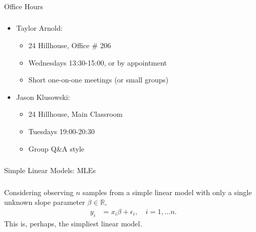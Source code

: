 \begin{frame}[fragile] \frametitle{}

\begin{flushright}
{\color{yaleblue}\sc\fontsize{1cm}{0cm}\selectfont Office Hours}
\end{flushright}

\end{frame}


\begin{frame}[fragile] \frametitle{}

\begin{itemize}
\item Taylor Arnold:
\begin{itemize}
\item 24 Hillhouse, Office \# 206
\item Wednesdays 13:30-15:00, or by appointment
\item Short one-on-one meetings (or small groups)
\end{itemize}
\item Jason Klusowski:
\begin{itemize}
\item 24 Hillhouse, Main Classroom
\item Tuesdays 19:00-20:30
\item Group Q\&A style
\end{itemize}
\end{itemize}

\end{frame}


\begin{frame}[fragile] \frametitle{}

\begin{flushright}
{\color{yaleblue}\sc\fontsize{1cm}{0cm}\selectfont Simple Linear Models: MLEs}
\end{flushright}

\end{frame}

\begin{frame}[fragile] \frametitle{}

Considering observing $n$ samples
from a simple linear model with only a single unknown
slope parameter $\beta \in \mathbb{R}$, \pause
\begin{align*}
y_i &= x_i\beta  + \epsilon_i, \quad i = 1, \ldots n.
\end{align*}
This is, perhaps, the simpliest linear model.

\end{frame}

